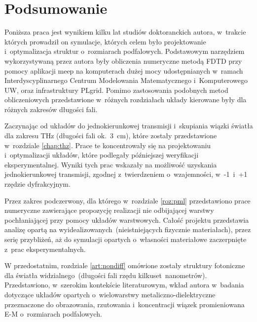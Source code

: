 \chapter{Podsumowanie}
Poniższa praca jest wynikiem kilku lat studiów doktoranckich autora, w~trakcie których prowadził on symulacje, których celem było projektowanie i~optymalizacja struktur o~rozmiarach podfalowych. Podstawowym narzędziem wykorzystywaną przez autora były obliczenia numeryczne metodą FDTD przy pomocy aplikacji meep\cite{OskooiRo10} na komputerach dużej mocy udostępnianych w~ramach Interdyscyplinarnego Centrum Modelowania Matematycznego i~Komputerowego UW, oraz infrastruktury PLgrid. Pomimo zastosowania podobnych metod obliczeniowych przedstawione w~różnych rozdziałach układy kierowane były dla różnych zakresów długości fali.

Zaczynając od układów do jednokierunkowej transmisji i~skupiania wiązki światła dla zakresu THz (długości fali ok.~3~cm), które zostały przedstawione w~rozdziale \ref{chap:thz}. Prace te koncentrowały się na projektowaniu i~optymalizacji układów, które podlegały późniejszej weryfikacji eksperymentalnej. Wyniki tych prac wskazały na możliwość uzyskania jednokierunkowej transmisji, zgodnej z~twierdzeniem o~wzajemności, w~-1~i~+1 rzędzie dyfrakcyjnym.

Przez zakres podczerwony, dla którego w~rozdziale \ref{roz:pml} przedstawiono prace numeryczne zawierające propozycję realizacji nie odbijającej warstwy pochłaniającej przy pomocy układów warstwowych. Całość projektu przedstawia analizę opartą na wyidealizowanych~(nieistniejących fizycznie materiałach), przez serię przybliżeń, aż do symulacji opartych o~własności materiałowe zaczerpnięte z~prac eksperymentalnych.

W przedostatnim,  rozdziale \ref{art:nondiff}  omówione zostały struktury fotoniczne dla światła widzialnego~(długości fali rzędu kilkuset~nanometrów). Przedstawiono, w~szerokim kontekście literaturowym, wkład autora w~badania dotyczące układów opartych o~wielowarstwy metaliczno-dielektryczne przeznaczone do obrazowania, rzutowania i~koncentracji wiązek promieniowana E-M o~rozmiarach podfalowych.

